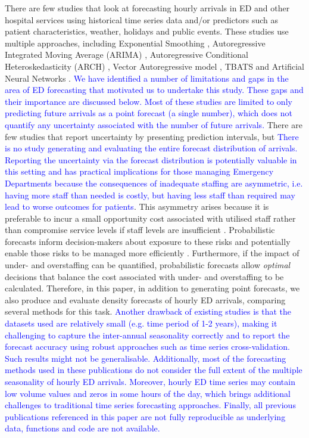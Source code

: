 \documentclass[]{elsarticle} %
\begin{document}
There are few studies that look at forecasting hourly arrivals in ED and
other hospital services using historical time series data and/or
predictors such as patient characteristics, weather, holidays and public
events. These studies use multiple approaches, including Exponential
Smoothing \citep{SvetunkovAdam}, Autoregressive Integrated Moving Average
(ARIMA) \citep{hyndman2021forecasting}, Autoregressive Conditional
Heteroskedasticity (ARCH) \citep{bollerslev1994arch}, Vector Autoregressive
model \citep{lutkepohl2013vector}, TBATS \citep{de2011forecasting} and Artificial
Neural Networks \citep{hyndman2021forecasting}. \textcolor{blue}{We have identified a number of limitations and gaps in the area of ED forecasting that motivated us to undertake this study. These gaps and their importance are discussed below.} \textcolor{blue}{Most of these studies are limited to only predicting future arrivals as a point
forecast (a single number), which does not quantify any uncertainty associated with the number of future arrivals.} There are few studies that report uncertainty by presenting prediction intervals, but \textcolor{blue}{There is no study generating and evaluating the entire forecast distribution of arrivals. Reporting the uncertainty via the forecast distribution is potentially valuable in this setting and has practical implications for those managing Emergency Departments because the consequences of inadequate staffing are asymmetric, i.e. having more staff than needed is costly, but
having less staff than required may lead to worse outcomes for patients}. This asymmetry arises because it is preferable to incur a small opportunity cost associated with utilised staff rather than compromise service levels if staff levels are insufficient \citep{wright2006reexamining}. Probabilistic forecasts inform decision-makers about exposure to these risks and potentially enable those risks to be managed more efficiently \citep{ramos2013probabilistic, ROSTAMITABAR20221197}. Furthermore, if the impact of under- and overstaffing can be quantified,
probabilistic forecasts allow \emph{optimal} decisions that balance the cost associated with under- and overstaffing to be calculated. Therefore, in this paper, in addition to generating point forecasts, we also produce and evaluate density forecasts of hourly ED arrivals, comparing several methods for this task. \textcolor{blue}{Another drawback of existing studies is that the datasets used are relatively small (e.g. time period of 1-2 years), making it challenging to capture the inter-annual seasonality correctly and to report the forecast accuracy using robust approaches such as time series cross-validation. Such results might not be generalisable. Additionally, most of the forecasting methods used in these publications do not consider the full extent of the multiple seasonality of hourly ED arrivals. Moreover, hourly ED time series may contain low volume values and zeros in some hours of the day, which brings additional challenges to traditional time series forecasting approaches. Finally, all previous publications referenced in this paper are not fully reproducible as underlying data, functions and code are not available.}
\end{document}
